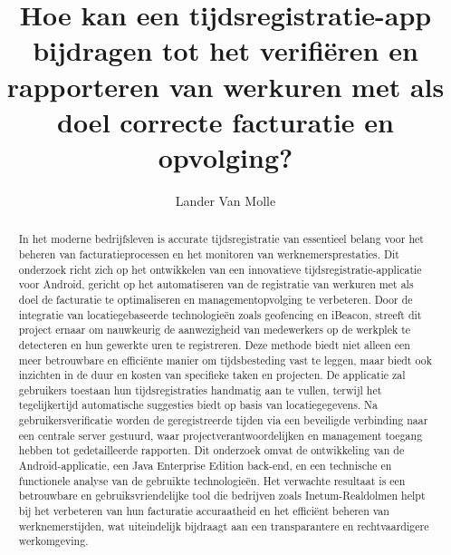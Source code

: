 \documentclass{hogent-article}
\title{Hoe kan een tijdsregistratie-app bijdragen tot het verifiëren en rapporteren van werkuren met als doel correcte facturatie en opvolging?}
\author{Lander {Van Molle}}
\begin{document}
\begin{abstract}
  In het moderne bedrijfsleven is accurate tijdsregistratie van essentieel belang voor het beheren van facturatieprocessen en het monitoren van werknemersprestaties. Dit onderzoek richt zich op het ontwikkelen van een innovatieve tijdsregistratie-applicatie voor Android, gericht op het automatiseren van de registratie van werkuren met als doel de facturatie te optimaliseren en managementopvolging te verbeteren. Door de integratie van locatiegebaseerde technologieën zoals geofencing en iBeacon, streeft dit project ernaar om nauwkeurig de aanwezigheid van medewerkers op de werkplek te detecteren en hun gewerkte uren te registreren. Deze methode biedt niet alleen een meer betrouwbare en efficiënte manier om tijdsbesteding vast te leggen, maar biedt ook inzichten in de duur en kosten van specifieke taken en projecten. De applicatie zal gebruikers toestaan hun tijdsregistraties handmatig aan te vullen, terwijl het tegelijkertijd automatische suggesties biedt op basis van locatiegegevens. Na gebruikersverificatie worden de geregistreerde tijden via een beveiligde verbinding naar een centrale server gestuurd, waar projectverantwoordelijken en management toegang hebben tot gedetailleerde rapporten. Dit onderzoek omvat de ontwikkeling van de Android-applicatie, een Java Enterprise Edition back-end, en een technische en functionele analyse van de gebruikte technologieën. Het verwachte resultaat is een betrouwbare en gebruiksvriendelijke tool die bedrijven zoals Inetum-Realdolmen helpt bij het verbeteren van hun facturatie accuraatheid en het efficiënt beheren van werknemerstijden, wat uiteindelijk bijdraagt aan een transparantere en rechtvaardigere werkomgeving.
\end{abstract}

\tableofcontents



\printbibliography[heading=bibintoc]
\end{document}
